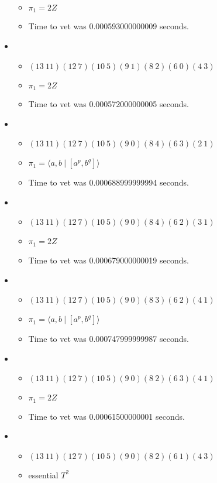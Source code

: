 \documentclass{article}
\begin{document}
\begin{itemize}
\begin{itemize}
      \item $\pi_1 =2 Z$
      \item Time to vet was 0.000593000000009 seconds.
\end{itemize}
\item \begin{itemize}
      \item $(13\ 11)(12\ 7)(10\ 5)(9\ 1)(8\ 2)(6\ 0)(4\ 3)$
      \item $\pi_1 =2 Z$
      \item Time to vet was 0.000572000000005 seconds.
\end{itemize}
\item \begin{itemize}
      \item $(13\ 11)(12\ 7)(10\ 5)(9\ 0)(8\ 4)(6\ 3)(2\ 1)$
      \item $\pi_1 = \langle a,b\ |\ [a^p,b^q]\rangle$
      \item Time to vet was 0.000688999999994 seconds.
\end{itemize}
\item \begin{itemize}
      \item $(13\ 11)(12\ 7)(10\ 5)(9\ 0)(8\ 4)(6\ 2)(3\ 1)$
      \item $\pi_1 =2 Z$
      \item Time to vet was 0.000679000000019 seconds.
\end{itemize}
\item \begin{itemize}
      \item $(13\ 11)(12\ 7)(10\ 5)(9\ 0)(8\ 3)(6\ 2)(4\ 1)$
      \item $\pi_1 = \langle a,b\ |\ [a^p,b^q]\rangle$
      \item Time to vet was 0.000747999999987 seconds.
\end{itemize}
\item \begin{itemize}
      \item $(13\ 11)(12\ 7)(10\ 5)(9\ 0)(8\ 2)(6\ 3)(4\ 1)$
      \item $\pi_1 =2 Z$
      \item Time to vet was 0.00061500000001 seconds.
\end{itemize}
\item \begin{itemize}
      \item $(13\ 11)(12\ 7)(10\ 5)(9\ 0)(8\ 2)(6\ 1)(4\ 3)$
      \item essential $T^2$

\end{itemize}
\end{itemize}
\end{document}
